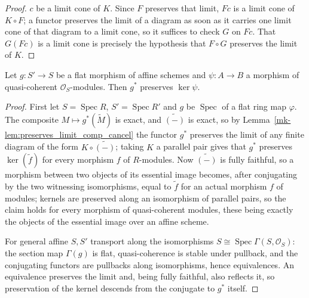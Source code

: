 \begin{proof}
  \leanokLet \(c\) be a limit cone of \(K\). Since \(F\) preserves that limit, \(F c\) is a limit cone of
  \(K \circ F\); a functor preserves the limit of a diagram as soon as it carries one limit cone
  of that diagram to a limit cone, so it suffices to check \(G\) on \(F c\). That \(G (F c)\) is a
  limit cone is precisely the hypothesis that \(F \circ G\) preserves the limit of \(K\).
\end{proof}

\begin{lemma}\label{mk-lem:flat_pullback_kernels_qcoh}
  \leanok

  Let \(g : S' \to S\) be a flat morphism of affine schemes and \(\psi : A \to B\) a morphism of
  quasi-coherent \(\mathcal{O}_S\)-modules. Then \(g^*\) preserves \(\ker \psi\).
\end{lemma}

\begin{proof}
  \leanok{}
  First let \(S = \operatorname{Spec} R\), \(S' = \operatorname{Spec} R'\) and \(g\) be
  \(\operatorname{Spec}\) of a flat ring map \(\varphi\). The composite \(M \mapsto g^*(\widetilde
  M)\) is exact, and \(\widetilde{(-)}\) is exact, so by
  Lemma~\ref{mk-lem:preserves_limit_comp_cancel} the functor \(g^*\) preserves the limit of any
  finite diagram of the form \(K \circ \widetilde{(-)}\); taking \(K\) a parallel pair gives that
  \(g^*\) preserves \(\ker(\widetilde f)\) for every morphism \(f\) of \(R\)-modules. Now
  \(\widetilde{(-)}\) is fully faithful, so a morphism between two objects of its essential image
  becomes, after conjugating by the two witnessing isomorphisms, equal to \(\widetilde f\) for an
  actual morphism \(f\) of modules; kernels are preserved along an isomorphism of parallel pairs,
  so the claim holds for every morphism of quasi-coherent modules, these being exactly the objects
  of the essential image over an affine scheme.

  For general affine \(S, S'\) transport along the isomorphisms \(S \cong \operatorname{Spec}
  \Gamma(S, \mathcal{O}_S)\): the section map \(\Gamma(g)\) is flat, quasi-coherence is stable
  under pullback, and the conjugating functors are pullbacks along isomorphisms, hence
  equivalences. An equivalence preserves the limit and, being fully faithful, also reflects it, so
  preservation of the kernel descends from the conjugate to \(g^*\) itself.
\end{proof}


